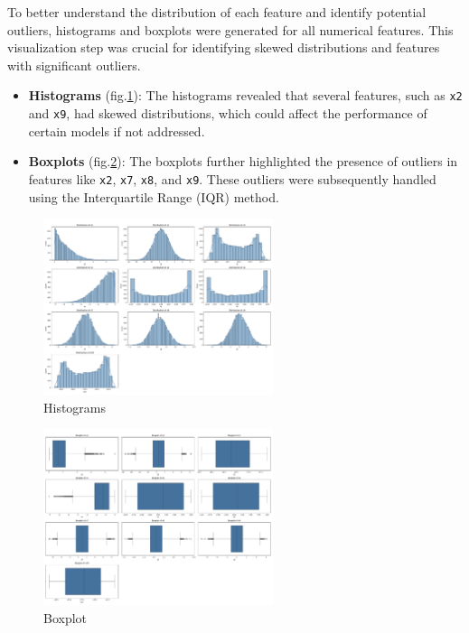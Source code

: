 \documentclass[a4paper, 10pt]{article}
\begin{document}
To better understand the distribution of each feature and identify potential outliers, histograms and boxplots were generated for all numerical features. This visualization step was crucial for identifying skewed distributions and features with significant outliers.

\begin{itemize}
    \item \textbf{Histograms} (fig.\ref{fig:histograms}): The histograms revealed that several features, such as \texttt{x2} and \texttt{x9}, had skewed distributions, which could affect the performance of certain models if not addressed.
    \item \textbf{Boxplots} (fig.\ref{fig:boxplots}): The boxplots further highlighted the presence of outliers in features like \texttt{x2}, \texttt{x7}, \texttt{x8}, and \texttt{x9}. These outliers were subsequently handled using the Interquartile Range (IQR) method.
\end{itemize}

\begin{figure}[H]
    \centering
    \includegraphics[width=0.6\textwidth]{images/histograms.png}
    \caption{Histograms}
    \label{fig:histograms}
\end{figure}
\begin{figure}[H]
    \centering
    \includegraphics[width=0.6\textwidth]{images/boxplots.png}
    \caption{Boxplot}
    \label{fig:boxplots}
\end{figure}
\end{document}
